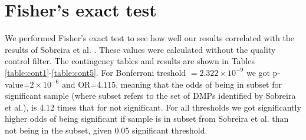 \section{Fisher's exact test}
\label{section:results:Fisher-test}
We performed Fisher's exact test to see how well our results correlated with the results of Sobreira et al. \cite{sobreira2017patients}. These values were calculated without the quality control filter. The contingency tables and results are shown in Tables \ref{table:cont1}-\ref{table:cont5}. For Bonferroni treshold $=2.322 \times 10^{-9}$ we got p-value=$2\times 10^{-6}$ and OR=4.115, meaning that the odds of being in subset for significant sample (where subset refers to the set of DMPs identified by Sobreira et al.), is 4.12 times that for not significant. For all thresholds we got significantly higher odds of being significant if sample is in subset from Sobreira et al. \cite{sobreira2017patients} than not being in the subset, given 0.05 significant threshold.


